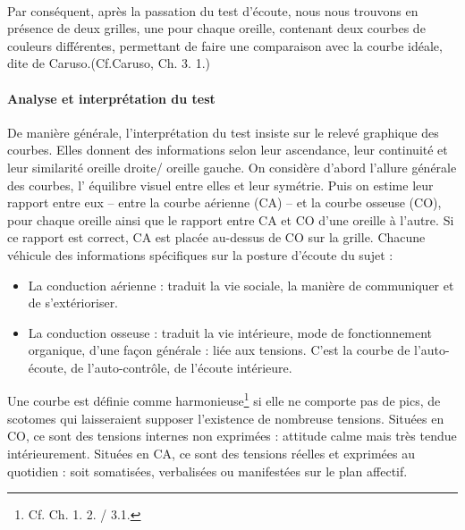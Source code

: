  \\
 Par conséquent, après la passation du test d\textquoteright écoute, nous nous
trouvons en présence de deux grilles, une  pour chaque oreille, contenant deux courbes
de couleurs différentes, permettant de faire une comparaison avec la courbe
 idéale, dite de Caruso.(Cf.Caruso, Ch. 3. 1.)
\paragraph{Analyse et interprétation du test}
De manière générale, l'interprétation du test insiste sur le relevé graphique
des
courbes. Elles donnent des informations selon leur ascendance, leur
continuité et leur similarité oreille droite/ oreille gauche.
On considère d'abord l'allure générale des courbes,
 l' équilibre visuel entre elles et leur symétrie.
Puis on estime
leur rapport entre eux -- entre la courbe aérienne (CA) -- et la courbe osseuse (CO),
pour chaque oreille ainsi que le rapport entre CA et CO d\textquoteright une
oreille à l'autre. Si ce rapport est correct, CA est placée au-dessus
de CO sur la grille.
Chacune  véhicule des informations spécifiques
sur la posture d'écoute du sujet :
\begin{itemize}
\item La conduction aérienne : traduit la vie sociale, la manière de communiquer
et de s'extérioriser.
\item La conduction osseuse : traduit la vie intérieure, mode de fonctionnement
organique, d'une façon générale : liée aux tensions. C'est la courbe
de l\textquoteright auto-écoute, de l\textquoteright auto-contrôle,
de l'écoute intérieure.
\end{itemize}

Une courbe est définie comme harmonieuse\footnote{Cf. Ch. 1. 2. / 3.1.}
si elle ne comporte pas de
pics, de scotomes
qui laisseraient
supposer l'existence de nombreuse tensions.
Situées en CO, ce sont des tensions internes non exprimées : attitude
calme mais très tendue intérieurement.
Situées en CA, ce sont des tensions réelles et exprimées au quotidien
: soit somatisées, verbalisées ou manifestées sur le plan
affectif.

